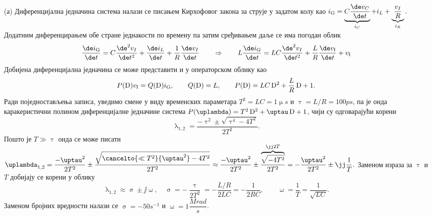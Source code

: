 (а) Диференцијална једначина система 
налази се писањем Кирхофовог закона за 
струје у задатом колу као 
$
i_{\rm G} = \underbrace{C\dfrac{\de v_C}{\de t}}_{i_C} 
            + i_L
            + \underbrace{\dfrac{v_I}{R}}_{i_R}.
$
Додатним диференцирањем обе стране једнакости по времену па затим сређивањем даље се има 
погодан облик 
\begin{eqnarray}
    \dfrac{\de i_{\rm G}}{\de t} = 
    C\dfrac{\de^2 v_I}{\de t^2} 
    + \dfrac{\de i_L}{\de t}
    + \dfrac{1}{R} \dfrac{\de v_I}{\de t} 
    \qquad 
    \Rightarrow
    \qquad
    L \dfrac{\de i_{\rm G}}{\de t} = 
    LC\dfrac{\de^2 v_I  }{\de t^2} 
    + \dfrac{L}{R} \dfrac{\de v_{\rm I}}{\de t} 
    + v_{\rm I}
\end{eqnarray}
Добијена диференцијална једначина се 
може представити и у операторском 
облику као 
\begin{equation}
    P({\rm D}) v_{\rm I}
    =
    Q({\rm D}) i_{\rm G} 
     , 
    \qquad
    Q({\rm D}) = L, \qquad
    P({\rm D}) = LC\,{\rm D}^2 + 
    \dfrac{L}{R}\, {\rm D} + 1.
\end{equation}
Ради поједностављења записа, уведимо смене 
у виду временских параметара 
$T^2 = LC = 1\unit{\upmu s}$ и $\uptau = L/R = 100\unit{ps}$, 
па је онда каракеристични полином диференцијалне једначине система
$P(\uplambda) = T^2\,{\rm D}^2
+ \uptau\,{\rm D} + 1$, чији су одговарајући корени 
\begin{equation}
    \uplambda_{1,2} = \dfrac{-\uptau^2 \pm \sqrt{\uptau^4 - 4T^2} }{2T^2}.
\end{equation}
Пошто је $T \gg \uptau$ онда се може писати 
$
    \uplambda_{1,2} = \dfrac{-\uptau^2}{2T^2} \pm \dfrac{\sqrt{ \cancelto{\ll T^2}{\uptau^2} - 4T^2 }}{2T^2} 
    \approx  \dfrac{-\uptau^2}{2T^2} \pm \dfrac{\overbrace{\sqrt{ - 4T^2 }}^{\jj 2T } }{2T^2}
    = - \dfrac{\uptau^2}{2T^2} \pm \jj\dfrac{1}{T}. 
$ Заменом израза за $\uptau$ и $T$ добијају се корени у облику 
\begin{equation}
    \uplambda_{1,2} \approx \upsigma \pm \jj \upomega, \quad
    \upsigma = -\dfrac{\uptau}{2T^2} 
    = -\dfrac{L/R}{2LC} = - \dfrac{1}{2RC}, 
    \qquad
    \upomega = \dfrac{1}{T} = \dfrac{1}{\sqrt{LC}}.
\end{equation}
Заменом бројних вредности налази се $\upsigma = -50\unit{s^{-1}}$ и $\upomega = 1\unit{\dfrac{Mrad}{s}}$.

